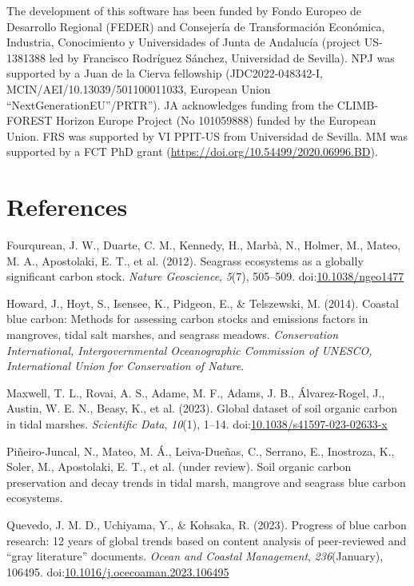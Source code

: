 \documentclass[10pt,a4paper,onecolumn]{article}
\newlength{\cslhangindent}
\newenvironment{CSLReferences}[2] %
 {\begin{list}{}{%
  \setlength{\itemindent}{0pt}
  \setlength{\leftmargin}{0pt}
  \setlength{\parsep}{0pt}
  \ifodd #1
   \setlength{\leftmargin}{\cslhangindent}
   \setlength{\itemindent}{-1\cslhangindent}
  \fi
  \setlength{\itemsep}{#2\baselineskip}}}
 {\end{list}}
\begin{document}
The development of this software has been funded by Fondo Europeo de
Desarrollo Regional (FEDER) and Consejería de Transformación Económica,
Industria, Conocimiento y Universidades of Junta de Andalucía (project
US-1381388 led by Francisco Rodríguez Sánchez, Universidad de Sevilla).
NPJ was supported by a Juan de la Cierva fellowship (JDC2022-048342-I,
MCIN/AEI/10.13039/501100011033, European Union
``NextGenerationEU''/PRTR''). JA acknowledges funding from the
CLIMB-FOREST Horizon Europe Project (No 101059888) funded by the
European Union. FRS was supported by VI PPIT-US from Universidad de
Sevilla. MM was supported by a FCT PhD grant
(\url{https://doi.org/10.54499/2020.06996.BD}).

\section*{References}\label{references}

\label{refs}
\begin{CSLReferences}{1}{0}
Fourqurean, J. W., Duarte, C. M., Kennedy, H., Marbà, N., Holmer, M.,
Mateo, M. A., Apostolaki, E. T., et al. (2012). Seagrass ecosystems as a
globally significant carbon stock. \emph{Nature Geoscience},
\emph{5}(7), 505--509.
doi:\href{https://doi.org/10.1038/ngeo1477}{10.1038/ngeo1477}

Howard, J., Hoyt, S., Isensee, K., Pidgeon, E., \& Telszewski, M.
(2014). Coastal blue carbon: Methods for assessing carbon stocks and
emissions factors in mangroves, tidal salt marshes, and seagrass
meadows. \emph{Conservation International, Intergovernmental
Oceanographic Commission of UNESCO, International Union for Conservation
of Nature}.

Maxwell, T. L., Rovai, A. S., Adame, M. F., Adams, J. B., Álvarez-Rogel,
J., Austin, W. E. N., Beasy, K., et al. (2023). Global dataset of soil
organic carbon in tidal marshes. \emph{Scientific Data}, \emph{10}(1),
1--14.
doi:\href{https://doi.org/10.1038/s41597-023-02633-x}{10.1038/s41597-023-02633-x}

Piñeiro-Juncal, N., Mateo, M. Á., Leiva-Dueñas, C., Serrano, E.,
Inostroza, K., Soler, M., Apostolaki, E. T., et al. (under review). Soil
organic carbon preservation and decay trends in tidal marsh, mangrove
and seagrass blue carbon ecosystems.

Quevedo, J. M. D., Uchiyama, Y., \& Kohsaka, R. (2023). Progress of blue
carbon research: 12 years of global trends based on content analysis of
peer-reviewed and {``gray literature''} documents. \emph{Ocean and
Coastal Management}, \emph{236}(January), 106495.
doi:\href{https://doi.org/10.1016/j.ocecoaman.2023.106495}{10.1016/j.ocecoaman.2023.106495}

\end{CSLReferences}
\end{document}
